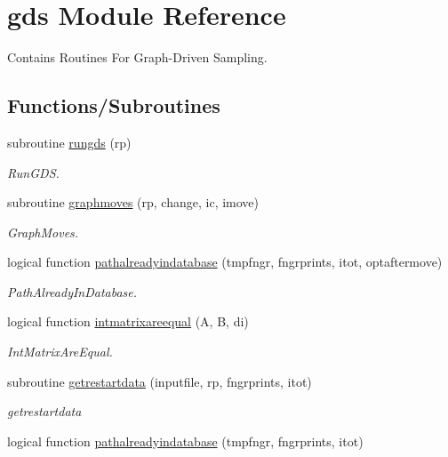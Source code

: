 \hypertarget{namespacegds}{}\section{gds Module Reference}
\label{namespacegds}


Contains Routines For Graph-\/\+Driven Sampling.  


\subsection*{Functions/\+Subroutines}
\begin{DoxyCompactItemize}
\item 
subroutine \mbox{\hyperlink{namespacegds_a505bda8be8e12ca409e712dbe5b808fe}{rungds}} (rp)
\begin{DoxyCompactList}\small\item\em Run\+G\+DS. \end{DoxyCompactList}\item 
subroutine \mbox{\hyperlink{namespacegds_a3627a05f4a2a627ffe858a325b19039a}{graphmoves}} (rp, change, ic, imove)
\begin{DoxyCompactList}\small\item\em Graph\+Moves. \end{DoxyCompactList}\item 
logical function \mbox{\hyperlink{namespacegds_aadeb6df7bf80a77b35e92ead33b8fb0e}{pathalreadyindatabase}} (tmpfngr, fngrprints, itot, optaftermove)
\begin{DoxyCompactList}\small\item\em Path\+Already\+In\+Database. \end{DoxyCompactList}\item 
logical function \mbox{\hyperlink{namespacegds_aae15af5058102dda0da2ef57f771b5c9}{intmatrixareequal}} (A, B, di)
\begin{DoxyCompactList}\small\item\em Int\+Matrix\+Are\+Equal. \end{DoxyCompactList}\item 
subroutine \mbox{\hyperlink{namespacegds_a5d4e82b09433cbfcc43b9cc754295ef5}{getrestartdata}} (inputfile, rp, fngrprints, itot)
\begin{DoxyCompactList}\small\item\em getrestartdata \end{DoxyCompactList}\item 
logical function \mbox{\hyperlink{namespacegds_a8f5bba1f0d5b4a0677d42ee10e0dd6d0}{pathalreadyindatabase}} (tmpfngr, fngrprints, itot)

\end{DoxyCompactItemize}
